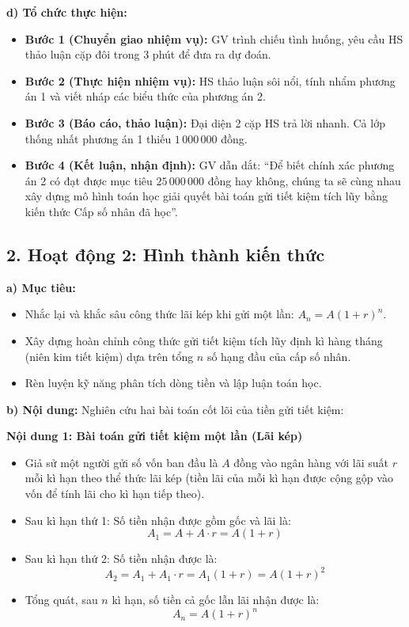 \documentclass[12pt, a4paper]{article}
\begin{document}
\noindent \textbf{d) Tổ chức thực hiện:}
\begin{itemize}
    \item \textbf{Bước 1 (Chuyển giao nhiệm vụ):} GV trình chiếu tình huống, yêu cầu HS thảo luận cặp đôi trong 3 phút để đưa ra dự đoán.
    \item \textbf{Bước 2 (Thực hiện nhiệm vụ):} HS thảo luận sôi nổi, tính nhẩm phương án 1 và viết nháp các biểu thức của phương án 2.
    \item \textbf{Bước 3 (Báo cáo, thảo luận):} Đại diện 2 cặp HS trả lời nhanh. Cả lớp thống nhất phương án 1 thiếu $1\,000\,000$ đồng.
    \item \textbf{Bước 4 (Kết luận, nhận định):} GV dẫn dắt: ``Để biết chính xác phương án 2 có đạt được mục tiêu $25\,000\,000$ đồng hay không, chúng ta sẽ cùng nhau xây dựng mô hình toán học giải quyết bài toán gửi tiết kiệm tích lũy bằng kiến thức Cấp số nhân đã học''.
\end{itemize}

\subsection*{2. Hoạt động 2: Hình thành kiến thức}

\noindent \textbf{a) Mục tiêu:}
\begin{itemize}
    \item Nhắc lại và khắc sâu công thức lãi kép khi gửi một lần: $A_n = A(1+r)^n$.
    \item Xây dựng hoàn chỉnh công thức gửi tiết kiệm tích lũy định kì hàng tháng (niên kim tiết kiệm) dựa trên tổng $n$ số hạng đầu của cấp số nhân.
    \item Rèn luyện kỹ năng phân tích dòng tiền và lập luận toán học.
\end{itemize}

\noindent \textbf{b) Nội dung:}
Nghiên cứu hai bài toán cốt lõi của tiền gửi tiết kiệm:

\noindent \textbf{Nội dung 1: Bài toán gửi tiết kiệm một lần (Lãi kép)}
\begin{itemize}
    \item Giả sử một người gửi số vốn ban đầu là $A$ đồng vào ngân hàng với lãi suất $r$ mỗi kì hạn theo thể thức lãi kép (tiền lãi của mỗi kì hạn được cộng gộp vào vốn để tính lãi cho kì hạn tiếp theo).
    \item Sau kì hạn thứ 1: Số tiền nhận được gồm gốc và lãi là:
    $$A_1 = A + A \cdot r = A(1+r)$$
    \item Sau kì hạn thứ 2: Số tiền nhận được là:
    $$A_2 = A_1 + A_1 \cdot r = A_1(1+r) = A(1+r)^2$$
    \item Tổng quát, sau $n$ kì hạn, số tiền cả gốc lẫn lãi nhận được là:
    \begin{equation}
        A_n = A(1+r)^n
    \end{equation}
\end{itemize}
\end{document}
